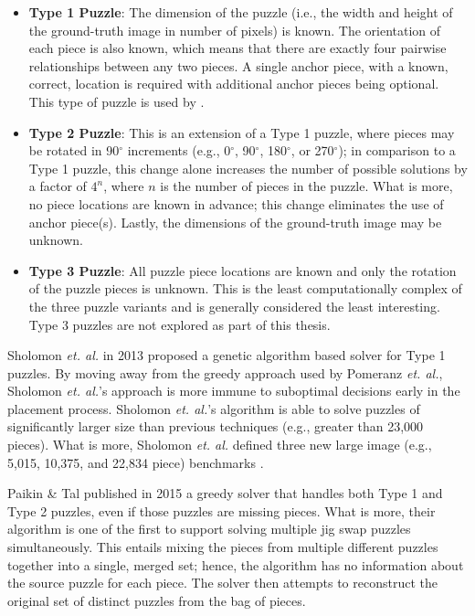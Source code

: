 \documentclass{report}
\newcommand{\numbwithdegreesymbol}[1]{#1$^\circ$}
\begin{document}
\begin{itemize}

	\item \textbf{Type 1 Puzzle}: The dimension of the puzzle (i.e., the width and height of the ground-truth image in number of pixels) is known.  The orientation of each piece is also known, which means that there are exactly four pairwise relationships between any two pieces.  A single anchor piece, with a known, correct, location is required with additional anchor pieces being optional.  This type of puzzle is used by \cite{cho2010, pomeranz2011}.
	
	\item \textbf{Type 2 Puzzle}: This is an extension of a Type 1 puzzle, where pieces may be rotated in \numbwithdegreesymbol{90} increments (e.g., \numbwithdegreesymbol{0}, \numbwithdegreesymbol{90}, \numbwithdegreesymbol{180}, or \numbwithdegreesymbol{270}); in comparison to a Type 1 puzzle, this change alone increases the number of possible solutions by a factor of $4^n$, where $n$ is the number of pieces in the puzzle.  What is more, no piece locations are known in advance; this change eliminates the use of anchor piece(s).  Lastly, the dimensions of the ground-truth image may be unknown.
	
	\item \textbf{Type 3 Puzzle}: All puzzle piece locations are known and only the rotation of the puzzle pieces is unknown.  This is the least computationally complex of the three puzzle variants and is generally considered the least interesting.  Type 3 puzzles are not explored as part of this thesis.

\end{itemize}

Sholomon \textit{et. al.} \cite{sholomon2013} in 2013 proposed a genetic algorithm based solver for Type 1 puzzles.  By moving away from the greedy approach used by Pomeranz \textit{et. al.}, Sholomon \textit{et. al.}'s approach is more immune to suboptimal decisions early in the placement process. Sholomon \textit{et. al.}'s algorithm is able to solve puzzles of significantly larger size than previous techniques (e.g., greater than 23,000 pieces).  What is more, Sholomon \textit{et. al.} defined three new large image (e.g., 5,015, 10,375, and 22,834 piece) benchmarks \cite{sholomonBenchmarkImages}.

Paikin \& Tal \cite{paikin2015} published in 2015 a greedy solver that handles both Type 1 and Type 2 puzzles, even if those puzzles are missing pieces.  What is more, their algorithm is one of the first to support solving multiple jig swap puzzles simultaneously.  This entails mixing the pieces from multiple different puzzles together into a single, merged set; hence, the algorithm has no information about the source puzzle for each piece.  The solver then attempts to reconstruct the original set of distinct puzzles from the bag of pieces.
\end{document}

